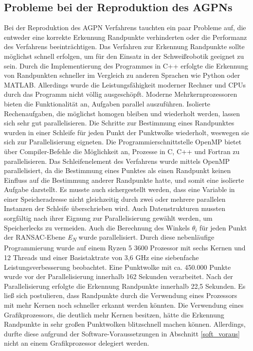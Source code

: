 \subsection{Probleme bei der Reproduktion des AGPNs}
Bei der Reproduktion des AGPN Verfahrens tauchten ein paar Probleme auf, die entweder eine korrekte Erkennung Randpunkte verhinderten oder die Performanz des Verfahrens beeinträchtigen. Das Verfahren zur Erkennung Randpunkte sollte möglichst schnell erfolgen, um für den Einsatz in der Schweißrobotik geeignet zu sein. Durch die Implementierung des Programmes in C++ erfolgte die Erkennung von Randpunkten schneller im Vergleich zu anderen Sprachen wie Python oder MATLAB. Allerdings wurde die Leistungsfähigkeit moderner Rechner und CPUs durch das Programm nicht völlig ausgeschöpft. Moderne Mehrkernprozessoren bieten die Funktionalität an, Aufgaben parallel auszuführen. Isolierte Rechenaufgaben, die möglichst homogen bleiben und wiederholt werden, lassen sich sehr gut parallelisieren. Die Schritte zur Bestimmung eines Randpunktes wurden in einer Schleife für jeden Punkt der Punktwolke wiederholt, weswegen sie sich zur Parallelisierung eigneten. Die Programmierschnittstelle OpenMP bietet über Compiler-Befehle die Möglichkeit an, Prozesse in C, C++ und Fortran zu parallelisieren. Das Schleifenelement des Verfahrens wurde mittels OpenMP parallelisiert, da die Bestimmung eines Punktes als einen Randpunkt keinen Einfluss auf die Bestimmung anderer Randpunkte hatte, und somit eine isolierte Aufgabe darstellt. Es musste auch sichergestellt werden, dass eine Variable in einer Speicheradresse nicht gleichzeitig durch zwei oder mehrere parallelen Instanzen der Schleife überschrieben wird. Auch Datenstrukturen mussten sorgfältig nach ihrer Eignung zur Parallelisierung gewählt werden, um Speicherlecks zu vermeiden. Auch die Berechnung des Winkels $\theta_i$ für jeden Punkt der RANSAC-Ebene \textit{E\textsubscript{N}} wurde parallelisiert. Durch diese nebenläufige Programmierung wurde auf einem Ryzen 5 3600 Prozessor \autocite{noauthor_amd_2022} mit sechs Kernen und 12 Threads und einer Basistaktrate von 3,6 GHz eine siebenfache Leistungsverbesserung beobachtet. Eine Punktwolke mit ca. 450.000 Punkte wurde vor der Parallelisierung innerhalb 162 Sekunden verarbeitet. Nach der Parallelisierung erfolgte die Erkennung Randpunkte innerhalb 22,5 Sekunden. Es ließ sich postulieren, dass Randpunkte durch die Verwendung eines Prozessors mit mehr Kernen noch schneller erkannt werden könnten. Die Verwendung eines Grafikprozessors, die deutlich mehr Kernen besitzen, hätte die Erkennung Randpunkte in sehr großen Punktwolken blitzschnell machen können. Allerdings, durfte diese aufgrund der Software-Voraussetzungen in Abschnitt \ref{soft_voraus} nicht an einem Grafikprozessor delegiert werden.

